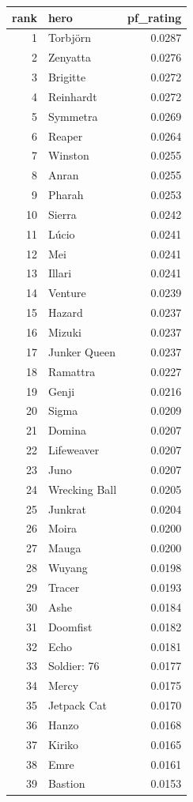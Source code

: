 \begin{tabular}{rlr}
\toprule
rank & hero & pf_rating \\
\midrule
1 & Torbjörn & 0.0287 \\
2 & Zenyatta & 0.0276 \\
3 & Brigitte & 0.0272 \\
4 & Reinhardt & 0.0272 \\
5 & Symmetra & 0.0269 \\
6 & Reaper & 0.0264 \\
7 & Winston & 0.0255 \\
8 & Anran & 0.0255 \\
9 & Pharah & 0.0253 \\
10 & Sierra & 0.0242 \\
11 & Lúcio & 0.0241 \\
12 & Mei & 0.0241 \\
13 & Illari & 0.0241 \\
14 & Venture & 0.0239 \\
15 & Hazard & 0.0237 \\
16 & Mizuki & 0.0237 \\
17 & Junker Queen & 0.0237 \\
18 & Ramattra & 0.0227 \\
19 & Genji & 0.0216 \\
20 & Sigma & 0.0209 \\
21 & Domina & 0.0207 \\
22 & Lifeweaver & 0.0207 \\
23 & Juno & 0.0207 \\
24 & Wrecking Ball & 0.0205 \\
25 & Junkrat & 0.0204 \\
26 & Moira & 0.0200 \\
27 & Mauga & 0.0200 \\
28 & Wuyang & 0.0198 \\
29 & Tracer & 0.0193 \\
30 & Ashe & 0.0184 \\
31 & Doomfist & 0.0182 \\
32 & Echo & 0.0181 \\
33 & Soldier: 76 & 0.0177 \\
34 & Mercy & 0.0175 \\
35 & Jetpack Cat & 0.0170 \\
36 & Hanzo & 0.0168 \\
37 & Kiriko & 0.0165 \\
38 & Emre & 0.0161 \\
39 & Bastion & 0.0153 \\

\end{tabular}
